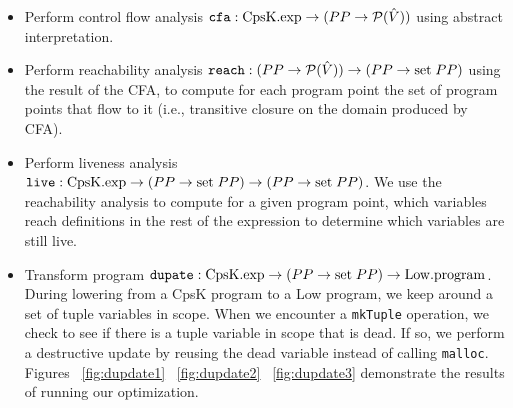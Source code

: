 \documentclass{article}
\begin{document}
\begin{itemize}
\item Perform control flow analysis ${\tt cfa} : {\rm CpsK.exp} \rightarrow (PP \rightarrow \mathcal{P}(\hat{V}))$ using abstract interpretation. 
\item Perform reachability analysis ${\tt reach} : (PP \rightarrow \mathcal{P}(\hat{V})) \rightarrow (PP \rightarrow {\rm set} \; PP)$ using the result of the CFA, to compute for each program point the set of program points that flow to it (i.e., transitive closure on the domain produced by CFA).
\item Perform liveness analysis ${\tt live} : {\rm CpsK.exp} \rightarrow (PP \rightarrow {\rm set} \; PP) \rightarrow (PP \rightarrow {\rm set} \; PP)$. We use the reachability analysis to compute for a given program point, which variables reach definitions in the rest of the expression to determine which variables are still live. 
\item Transform program ${\tt dupate} : {\rm CpsK.exp} \rightarrow (PP \rightarrow {\rm set} \; PP) \rightarrow {\rm Low.program}$. During lowering from a CpsK program to a Low program, we keep around a set of tuple variables in scope. When we encounter a {\tt mkTuple} operation, we check to see if there is a tuple variable in scope that is dead. If so, we perform a destructive update by reusing the dead variable instead of calling {\tt malloc}. Figures ~\ref{fig:dupdate1} ~\ref{fig:dupdate2} ~\ref{fig:dupdate3} demonstrate the results of running our optimization.
\end{itemize}
\end{document}
